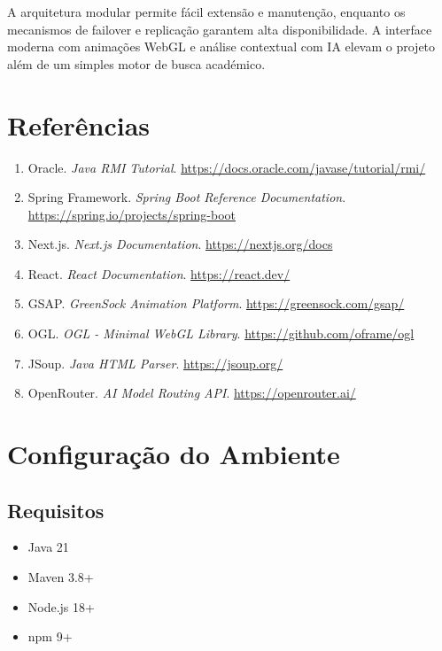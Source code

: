 \documentclass[12pt,a4paper]{article}
\begin{document}
A arquitetura modular permite fácil extensão e manutenção, enquanto os mecanismos de failover e replicação garantem alta disponibilidade. A interface moderna com animações WebGL e análise contextual com IA elevam o projeto além de um simples motor de busca académico.

\newpage

\section*{Referências}

\begin{enumerate}
    \item Oracle. \textit{Java RMI Tutorial}. \url{https://docs.oracle.com/javase/tutorial/rmi/}
    \item Spring Framework. \textit{Spring Boot Reference Documentation}. \url{https://spring.io/projects/spring-boot}
    \item Next.js. \textit{Next.js Documentation}. \url{https://nextjs.org/docs}
    \item React. \textit{React Documentation}. \url{https://react.dev/}
    \item GSAP. \textit{GreenSock Animation Platform}. \url{https://greensock.com/gsap/}
    \item OGL. \textit{OGL - Minimal WebGL Library}. \url{https://github.com/oframe/ogl}
    \item JSoup. \textit{Java HTML Parser}. \url{https://jsoup.org/}
    \item OpenRouter. \textit{AI Model Routing API}. \url{https://openrouter.ai/}
\end{enumerate}

\newpage

\appendix

\section{Configuração do Ambiente}

\subsection{Requisitos}
\begin{itemize}
    \item Java 21
    \item Maven 3.8+
    \item Node.js 18+
    \item npm 9+
\end{itemize}
\end{document}
